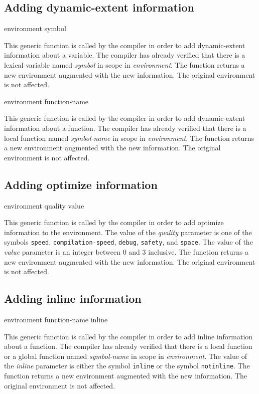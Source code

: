 \subsection{Adding dynamic-extent information}

 {environment symbol}

This generic function is called by the compiler in order to add
dynamic-extent information about a variable.  The compiler has already
verified that there is a lexical variable named \textit{symbol} in
scope in \textit{environment}.  The function returns a new environment
augmented with the new information.  The original environment is not
affected.

 {environment function-name}

This generic function is called by the compiler in order to add
dynamic-extent information about a function.  The compiler has already
verified that there is a local function named \textit{symbol-name} in
scope in \textit{environment}.  The function returns a new environment
augmented with the new information.  The original environment is not
affected.

\subsection{Adding optimize information}

 {environment quality value}

This generic function is called by the compiler in order to add
optimize information to the environment.  The value of the
\textit{quality} parameter is one of the symbols \texttt{speed},
\texttt{compilation-speed}, \texttt{debug}, \texttt{safety}, and
\texttt{space}.  The value of the \textit{value} parameter is an
integer between $0$ and $3$ inclusive.  The function returns a new
environment augmented with the new information.  The original
environment is not affected.

\subsection{Adding inline information}

 {environment function-name inline}

This generic function is called by the compiler in order to add inline
information about a function.  The compiler has already verified that
there is a local function or a global function named
\textit{symbol-name} in scope in \textit{environment}.  The value of
the \textit{inline} parameter is either the symbol \texttt{inline} or
the symbol \texttt{notinline}.  The function returns a new environment
augmented with the new information.  The original environment is not
affected.

